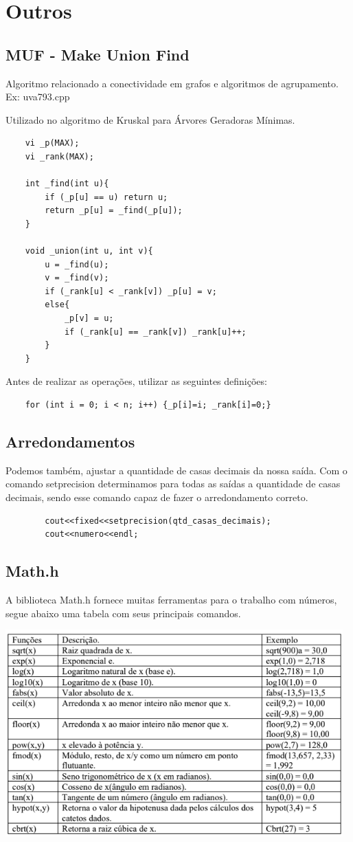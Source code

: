 \section{Outros}

\subsection{MUF - Make Union Find}

Algoritmo relacionado a conectividade em grafos e algoritmos de agrupamento. Ex: uva793.cpp
\par Utilizado no algoritmo de Kruskal para Árvores Geradoras Mínimas.
\begin{verbatim}
    vi _p(MAX);
    vi _rank(MAX);

    int _find(int u){
        if (_p[u] == u) return u;
        return _p[u] = _find(_p[u]);
    }

    void _union(int u, int v){
        u = _find(u);
        v = _find(v);
        if (_rank[u] < _rank[v]) _p[u] = v;
        else{
            _p[v] = u;
            if (_rank[u] == _rank[v]) _rank[u]++;
        }
    }
\end{verbatim}

\par Antes de realizar as operações, utilizar as seguintes definições:
\begin{verbatim}
    for (int i = 0; i < n; i++) {_p[i]=i; _rank[i]=0;}
\end{verbatim}

\subsection{Arredondamentos}
    Podemos também, ajustar a quantidade de casas decimais da nossa saída. Com o comando
    setprecision determinamos para todas as saídas a quantidade de casas decimais, sendo 
    esse comando capaz de fazer o arredondamento correto.
    \begin{verbatim}
        cout<<fixed<<setprecision(qtd_casas_decimais);
        cout<<numero<<endl;
    \end{verbatim}  

\subsection{Math.h}
    A biblioteca Math.h fornece muitas ferramentas para o trabalho com números, segue abaixo 
    uma tabela com seus principais comandos.

    \includegraphics[width=130mm]{11_outros/ComandosMath.png}
    \pagebreak
    